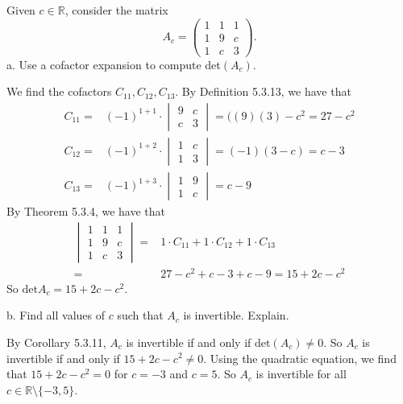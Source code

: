 \documentclass[12pt]{article}
\newenvironment{problem}[2][Problem]
{
	\begin{trivlist} 
		\item[\hskip \labelsep {\bfseries #1 #2:}]
	}
{
	\end{trivlist}
	}
\newenvironment{solution}[1][Solution]
{
	\begin{trivlist} 
		\item[\hskip \labelsep {\itshape #1:}]
	}
	{
	\end{trivlist}
}
\begin{document}
\newpage
\begin{problem}{4}
Given $c\in\mathbb{R}$, consider the matrix
\[
A_c = \begin{pmatrix} 1&1&1\\1&9&c\\1&c&3\end{pmatrix} \text{.}
\]
\noindent
\newline
\newline
a. Use a cofactor expansion to compute det$(A_c)$.
\begin{solution}
We find the cofactors $C_{11},C_{12},C_{13}$. By Definition 5.3.13, we have that
\begin{align*}
C_{11}=&(-1)^{1+1}\cdot \begin{vmatrix}9&c\\c&3\end{vmatrix} = ((9)(3)-c^2 = 27-c^2\\
C_{12}=&(-1)^{1+2} \cdot \begin{vmatrix} 1&c\\1&3 \end{vmatrix} = (-1)(3-c) = c-3\\
C_{13}=&(-1)^{1+3} \cdot \begin{vmatrix} 1&9\\1&c \end{vmatrix} = c-9
\end{align*}
By Theorem 5.3.4, we have that
\begin{align*}
\begin{vmatrix} 1&1&1\\1&9&c\\1&c&3\end{vmatrix} =& 1\cdot C_{11} + 1\cdot C_{12} + 1\cdot C_{13}\\
=& 27-c^2 +c-3+c-9 = 15+2c-c^2
\end{align*}
So $\text{det}A_c = 15+2c-c^2$.
\end{solution}
%
\noindent
\newline
\newline
b. Find all values of $c$ such that $A_c$ is invertible. Explain.
\begin{solution}
By Corollary 5.3.11, $A_c$ is invertible if and only if $\text{det}(A_c) \neq 0$. So $A_c$ is invertible if and only if $15+2c-c^2\neq 0$. Using the quadratic equation, we find that $15+2c-c^2=0$ for $c=-3$ and $c=5$. So $A_c$ is invertible for all $c \in \mathbb{R} \setminus \{-3,5\}$.
\end{solution}
\end{problem}
\end{document}
